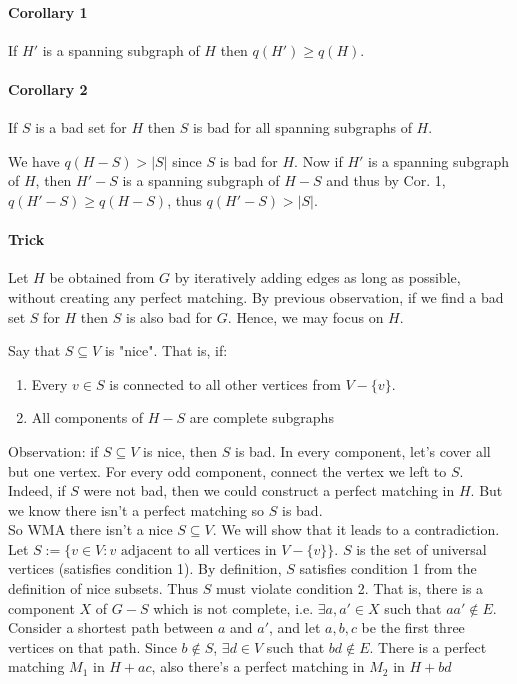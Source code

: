 		\paragraph{Corollary 1} If $H'$ is a spanning subgraph of $H$ then  $q(H') \geq q(H)$.
		
		\paragraph{Corollary 2} If $S$ is a bad set for $H$ then $S$ is bad for all spanning subgraphs of $H$.
		
		We have $q(H -S) > |S|$ since $S$ is bad for $H$. Now if $H'$ is a spanning subgraph of $H$, then $H' - S$ is a spanning subgraph of $H -S$ and thus by Cor. 1, $q(H' - S) \geq q(H - S)$, thus $q(H' - S) > |S|$.
		
		\paragraph{Trick} Let $H$ be obtained from $G$ by iteratively adding edges as long as possible, without creating any perfect matching. By previous observation, if we find a bad set $S$ for $H$ then $S$ is also bad for $G$. Hence, we may focus on $H$.
		
		Say that $S \subseteq V$ is "nice". That is, if:
		\begin{enumerate}
			\item Every $v \in S$ is connected to all other vertices from $V - \{ v \}$.
			\item All components of $H - S$ are complete subgraphs
		\end{enumerate}
		Observation: if $S \subseteq V$ is nice, then $S$ is bad. In every component, let's cover all but one vertex. For every odd component, connect the vertex we left to $S$. Indeed, if $S$ were not bad, then we could construct a perfect matching in $H$. But we know there isn't a perfect matching so $S$ is bad.\\
		
		So WMA there isn't a nice $S \subseteq V$. We will show that it leads to a contradiction. Let $S := \{ v \in V : v \text{ adjacent to all vertices in } V - \{ v \} \}$. $S$ is the set of universal vertices (satisfies condition 1). By definition, $S$ satisfies condition 1 from the definition of nice subsets. Thus $S$ must violate condition 2. That is, there is a component $X$ of $G - S$ which is not complete, i.e. $\exists a, a' \in X$ such that $aa' \notin E$. Consider a shortest path between $a$ and $a'$, and let $a, b, c$ be the first three vertices on that path. Since $b \notin S$, $\exists d \in V$ such that $bd \notin E$. There is a perfect matching $M_1$ in $H + ac$, also there's a perfect matching in $M_2$ in $H + bd$ 
		
